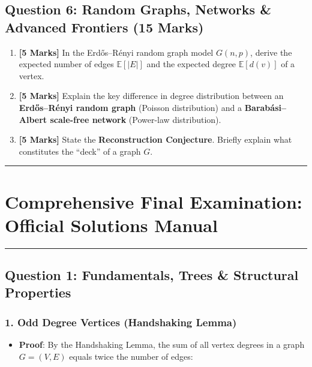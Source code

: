 \documentclass[
]{book}
\providecommand{\tightlist}{%
  \setlength{\itemsep}{0pt}\setlength{\parskip}{0pt}}
\theoremstyle{definition}
\theoremstyle{definition}
\theoremstyle{definition}
\theoremstyle{definition}
\theoremstyle{remark}
\begin{document}
\subsection{Question 6: Random Graphs, Networks \& Advanced Frontiers (15 Marks)}\label{question-6-random-graphs-networks-advanced-frontiers-15-marks}

\begin{enumerate}
\def\labelenumi{\arabic{enumi}.}
\tightlist
\item
  \textbf{{[}5 Marks{]}} In the Erdős--Rényi random graph model \(G(n, p)\), derive the expected number of edges \(\mathbb{E}[\vert{}E\vert{}]\) and the expected degree \(\mathbb{E}[d(v)]\) of a vertex.
\item
  \textbf{{[}5 Marks{]}} Explain the key difference in degree distribution between an \textbf{Erdős--Rényi random graph} (Poisson distribution) and a \textbf{Barabási--Albert scale-free network} (Power-law distribution).
\item
  \textbf{{[}5 Marks{]}} State the \textbf{Reconstruction Conjecture}. Briefly explain what constitutes the ``deck'' of a graph \(G\).
\end{enumerate}

\begin{center}\rule{0.5\linewidth}{0.5pt}\end{center}

\section{Comprehensive Final Examination: Official Solutions Manual}\label{comprehensive-final-examination-official-solutions-manual}

\begin{center}\rule{0.5\linewidth}{0.5pt}\end{center}

\subsection{Question 1: Fundamentals, Trees \& Structural Properties}\label{question-1-fundamentals-trees-structural-properties}

\subsubsection{1. Odd Degree Vertices (Handshaking Lemma)}\label{odd-degree-vertices-handshaking-lemma}

\begin{itemize}
\tightlist
\item
  \textbf{Proof}: By the Handshaking Lemma, the sum of all vertex degrees in a graph \(G = (V, E)\) equals twice the number of edges:
\end{itemize}
\end{document}
